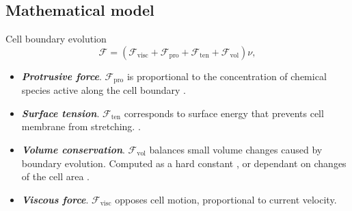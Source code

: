 \documentclass[12pt]{beamer}
\begin{document}
\subsection{Mathematical model}
\begin{frame}{Cell boundary evolution}
\begin{equation*}
\mathcal{F} = (\mathcal{F}_{\textrm{visc}} + \mathcal{F}_{\textrm{pro}} + \mathcal{F}_{\textrm{ten}} + \mathcal{F}_{\textrm{vol}})\nu,
\end{equation*}
\begin{itemize}
	\item \textbf{\textit{Protrusive force}}. $\mathcal{F}_{\textrm{pro}}$ is proportional to the concentration of chemical species active along the cell boundary \cite{Shao2010}. 
	\item \textbf{\textit{Surface tension}}. $\mathcal{F}_{\textrm{ten}}$ corresponds to surface energy that prevents cell membrane from stretching. \cite{Elliott2012}.
	\item \textbf{\textit{Volume conservation}}. $\mathcal{F}_{\textrm{vol}}$ balances small volume changes caused by boundary evolution. Computed as a hard constant \cite{Elliott2012}, or dependant on changes of the cell area \cite{Iglesias2013}.
	\item \textbf{\textit{Viscous force}}. $\mathcal{F}_{\textrm{visc}}$ opposes cell motion, proportional to current velocity.
\end{itemize}
$\quad$\\
$\quad$
\end{frame}
\end{document}

